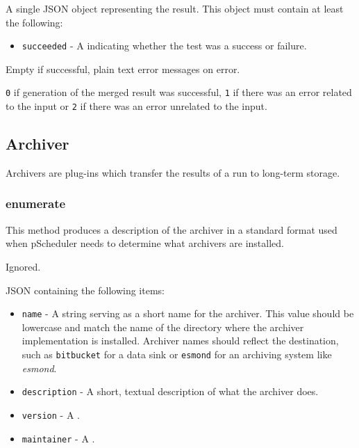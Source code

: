 \documentclass[10pt,titlepage]{article}
\begin{document}
 A single JSON object representing the
result.  This object must contain at least the following:

\begin{itemize}

\item{\tt succeeded} - A  indicating whether the
  test was a success or failure.

\end{itemize}


 Empty if successful, plain text error
messages on error.

 {\tt 0} if generation of the merged result
was successful, {\tt 1} if there was an error related to the input or
{\tt 2} if there was an error unrelated to the input.



%
%
\subsection{Archiver}
Archivers are plug-ins which transfer the results of a run to
long-term storage.




\subsubsection{enumerate}

This method produces a description of the archiver in a standard
format used when pScheduler needs to determine what archivers are
installed.

 Ignored.

 JSON containing the following items:
\begin{itemize}
\item{\tt name} - A string serving as a short name for the archiver.
  This value should be lowercase and match the name of the directory
  where the archiver implementation is installed.  Archiver names
  should reflect the destination, such as {\tt bitbucket} for a data
  sink or {\tt esmond} for an archiving system like {\it esmond}.
\item{\tt description} - A short, textual description of what the
  archiver does.
\item{\tt version} - A .
\item{\tt maintainer} - A .
\end{itemize}
\end{document}

